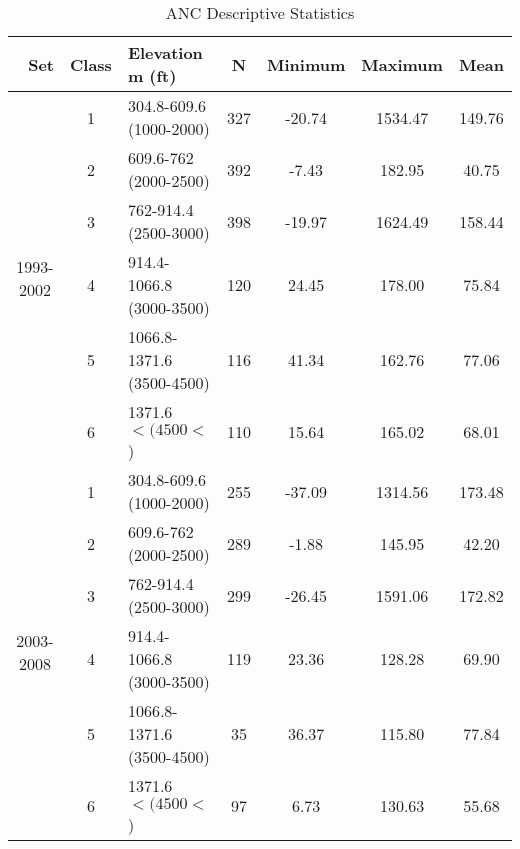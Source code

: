 \begin{table}[htbp]
  \centering
	\caption{ANC Descriptive Statistics}
    \begin{tabular}{rrlcccc}
    \toprule
    Set   & Class & Elevation m (ft) & N     & Minimum & Maximum & Mean \\
    \midrule
    \multicolumn{1}{c}{\multirow{6}[2]{*}{\begin{sideways}1993-2002\end{sideways}}} & \multicolumn{1}{c}{1} & \multicolumn{1}{l}{304.8-609.6 (1000-2000)} & 327   & -20.74  & 1534.47  & 149.76  \\
    \multicolumn{1}{c}{} & \multicolumn{1}{c}{2} & \multicolumn{1}{l}{609.6-762 (2000-2500)} & 392   & -7.43  & 182.95  & 40.75  \\
    \multicolumn{1}{c}{} & \multicolumn{1}{c}{3} & \multicolumn{1}{l}{762-914.4 (2500-3000)} & 398   & -19.97  & 1624.49  & 158.44  \\
    \multicolumn{1}{c}{} & \multicolumn{1}{c}{4} & \multicolumn{1}{l}{914.4-1066.8 (3000-3500)} & 120   & 24.45  & 178.00  & 75.84  \\
    \multicolumn{1}{c}{} & \multicolumn{1}{c}{5} & \multicolumn{1}{l}{1066.8-1371.6 (3500-4500)} & 116   & 41.34  & 162.76  & 77.06  \\
    \multicolumn{1}{c}{} & \multicolumn{1}{c}{6} & \multicolumn{1}{l}{1371.6$< (4500<$)} & 110   & 15.64  & 165.02  & 68.01  \\\midrule
    \multicolumn{1}{c}{\multirow{6}[2]{*}{\begin{sideways}2003-2008\end{sideways}}} & \multicolumn{1}{c}{1} & \multicolumn{1}{l}{304.8-609.6 (1000-2000)} & 255   & -37.09  & 1314.56  & 173.48  \\
    \multicolumn{1}{c}{} & \multicolumn{1}{c}{2} & \multicolumn{1}{l}{609.6-762 (2000-2500)} & 289   & -1.88  & 145.95  & 42.20  \\
    \multicolumn{1}{c}{} & \multicolumn{1}{c}{3} & \multicolumn{1}{l}{762-914.4 (2500-3000)} & 299   & -26.45  & 1591.06  & 172.82  \\
    \multicolumn{1}{c}{} & \multicolumn{1}{c}{4} & \multicolumn{1}{l}{914.4-1066.8 (3000-3500)} & 119   & 23.36  & 128.28  & 69.90  \\
    \multicolumn{1}{c}{} & \multicolumn{1}{c}{5} & \multicolumn{1}{l}{1066.8-1371.6 (3500-4500)} & 35    & 36.37  & 115.80  & 77.84  \\
    \multicolumn{1}{c}{} & \multicolumn{1}{c}{6} & \multicolumn{1}{l}{1371.6$< (4500<$)} & 97    & 6.73  & 130.63  & 55.68  \\\midrule

\end{tabular}
\end{table}
